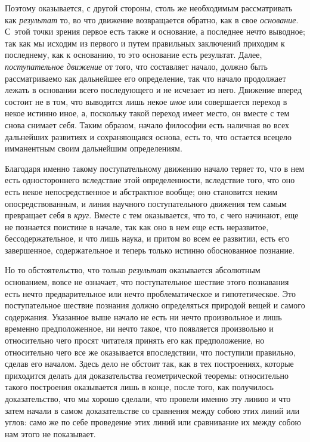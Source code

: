Поэтому оказывается, с другой стороны, столь же необходимым рассматривать
как {\em результат} то, во что движение возвращается
обратно, как в свое {\em основание}. С~этой точки
зрения первое есть также и основание, а последнее нечто выводное; так как
мы исходим из первого и путем правильных заключений приходим к последнему,
как к основанию, то это основание есть результат. Далее,
{\em поступательное движение} от того, что составляет
начало, должно быть рассматриваемо как дальнейшее его определение, так что
начало продолжает лежать в основании всего последующего и не исчезает из
него. Движение вперед состоит не в том, что выводится лишь некое
{\em иное} или совершается переход в некое истинно
иное, а, поскольку такой переход имеет место, он вместе с тем снова
снимает себя. Таким образом, начало философии есть наличная во всех
дальнейших развитиях и сохраняющаяся основа, есть то, что остается всецело
имманентным своим дальнейшим определениям.

Благодаря именно такому поступательному движению начало теряет то, что в нем
есть одностороннего вследствие этой определенности, вследствие того, что
оно есть некое непосредственное и абстрактное вообще; оно становится неким
опосредствованным, и линия научного поступательного движения тем самым
превращает себя в {\em круг}. Вместе с тем оказывается,
что то, с чего начинают, еще не познается поистине в начале, так как оно в
нем еще есть неразвитое, бессодержательное, и что лишь наука, и притом во
всем ее развитии, есть его завершенное, содержательное и теперь только
истинно обоснованное познание.

Но то обстоятельство, что только {\em результат}
оказывается абсолютным основанием, вовсе не означает, что поступательное
шествие этого познавания есть нечто предварительное или нечто
проблематическое и гипотетическое. Это поступательное шествие познания
должно определяться природой вещей и самого содержания. Указанное выше
начало не есть ни нечто произвольное и лишь временно предположенное, ни
нечто такое, что появляется произвольно и относительно чего просят читателя
принять его как предположение, но относительно чего все же оказывается
впоследствии, что поступили правильно, сделав его началом. Здесь дело не
обстоит так, как в тех построениях, которые приходится делать для
доказательства геометрической теоремы: относительно такого построения
оказывается лишь в конце, после того, как получилось доказательство, что мы
хорошо сделали, что провели именно эту линию и что затем начали в самом
доказательстве со сравнения между собою этих линий или углов: само же по
себе проведение этих линий или сравнивание их между собою нам этого не
показывает.

